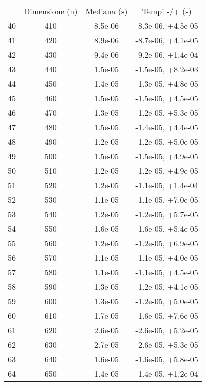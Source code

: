 \begin{table}
\centering
\begin{adjustbox}{width=1\textwidth/2}
\begin{tabular}{|c|c|c|c|}
\hline
 & Dimensione (n) & Mediana (s) & Tempi -/+ (s) \\
40 & 410 & 8.5e-06 & -8.3e-06, +4.5e-05 \\
\cline{1-4}
41 & 420 & 8.9e-06 & -8.7e-06, +4.1e-05 \\
\cline{1-4}
42 & 430 & 9.4e-06 & -9.2e-06, +1.4e-04 \\
\cline{1-4}
43 & 440 & 1.5e-05 & -1.5e-05, +8.2e-03 \\
\cline{1-4}
44 & 450 & 1.4e-05 & -1.3e-05, +4.8e-05 \\
\cline{1-4}
45 & 460 & 1.5e-05 & -1.5e-05, +4.5e-05 \\
\cline{1-4}
46 & 470 & 1.3e-05 & -1.2e-05, +5.3e-05 \\
\cline{1-4}
47 & 480 & 1.5e-05 & -1.4e-05, +4.4e-05 \\
\cline{1-4}
48 & 490 & 1.2e-05 & -1.2e-05, +5.0e-05 \\
\cline{1-4}
49 & 500 & 1.5e-05 & -1.5e-05, +4.9e-05 \\
\cline{1-4}
50 & 510 & 1.2e-05 & -1.2e-05, +4.9e-05 \\
\cline{1-4}
51 & 520 & 1.2e-05 & -1.1e-05, +1.4e-04 \\
\cline{1-4}
52 & 530 & 1.1e-05 & -1.1e-05, +7.0e-05 \\
\cline{1-4}
53 & 540 & 1.2e-05 & -1.2e-05, +5.7e-05 \\
\cline{1-4}
54 & 550 & 1.6e-05 & -1.6e-05, +5.4e-05 \\
\cline{1-4}
55 & 560 & 1.2e-05 & -1.2e-05, +6.9e-05 \\
\cline{1-4}
56 & 570 & 1.1e-05 & -1.1e-05, +4.0e-05 \\
\cline{1-4}
57 & 580 & 1.1e-05 & -1.1e-05, +4.5e-05 \\
\cline{1-4}
58 & 590 & 1.3e-05 & -1.2e-05, +4.1e-05 \\
\cline{1-4}
59 & 600 & 1.3e-05 & -1.2e-05, +5.0e-05 \\
\cline{1-4}
60 & 610 & 1.7e-05 & -1.6e-05, +7.6e-05 \\
\cline{1-4}
61 & 620 & 2.6e-05 & -2.6e-05, +5.2e-05 \\
\cline{1-4}
62 & 630 & 2.7e-05 & -2.6e-05, +5.3e-05 \\
\cline{1-4}
63 & 640 & 1.6e-05 & -1.6e-05, +5.8e-05 \\
\cline{1-4}
64 & 650 & 1.4e-05 & -1.4e-05, +1.2e-04 \\

\end{tabular}
\end{adjustbox}
\end{table}
